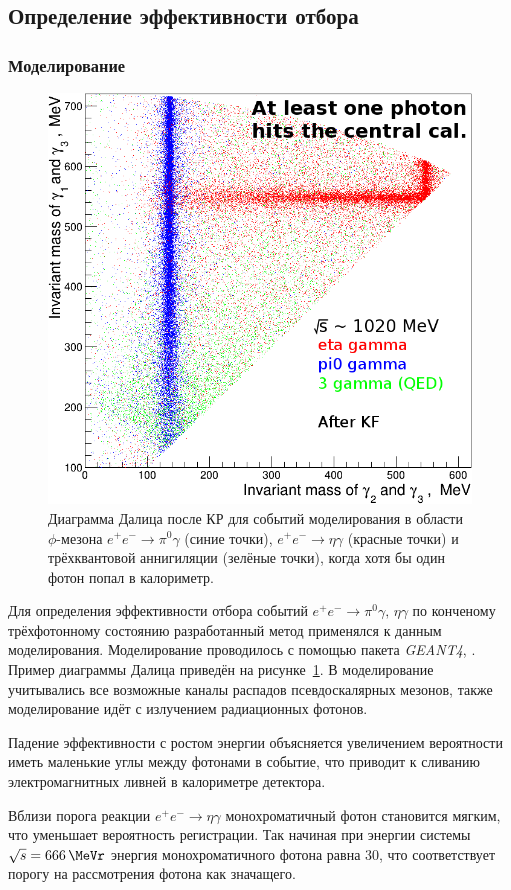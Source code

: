 \subsection{Определение эффективности отбора}



\subsubsection{Моделирование}

\begin{figure}
	\centering
	\includegraphics[width=.5\textwidth]{img/cm12mc.png}
	\caption{Диаграмма Далица после КР 
			для событий моделирования в области $\phi$-мезона
			$e^+ e^- \to \pi^0 \gamma$ (синие точки),
			$e^+ e^- \to \eta \gamma$ (красные точки)
			и трёхквантовой аннигиляции (зелёные точки),
			когда хотя бы один фотон попал в  калориметр.\label{fig:cm12mc}}
\end{figure}

Для определения эффективности отбора событий $e^+ e^- \to \pi^0 \gamma, \, \eta \gamma$ по конченому трёхфотонному состоянию разработанный метод применялся к данным моделирования.
Моделирование проводилось с помощью пакета \emph{GEANT4}, \cite{geant4Allison:2006ve}.
Пример диаграммы Далица приведён на рисунке~\ref{fig:cm12mc}.
В моделирование учитывались все возможные каналы распадов псевдоскалярных мезонов, также моделирование идёт с излучением радиационных фотонов.

Падение эффективности с ростом энергии объясняется увеличением вероятности иметь маленькие углы между фотонами в событие,
что приводит к сливанию электромагнитных ливней в калориметре детектора.

Вблизи порога реакции $e^+ e^- \to \eta \gamma$ монохроматичный фотон становится мягким, что уменьшает вероятность регистрации.
Так начиная при энергии системы $\sqrt{s} = \SI{666}{\MeVr}$ энергия монохроматичного фотона равна \SI{30}{\MeVr}, что соответствует порогу на рассмотрения фотона как значащего.

